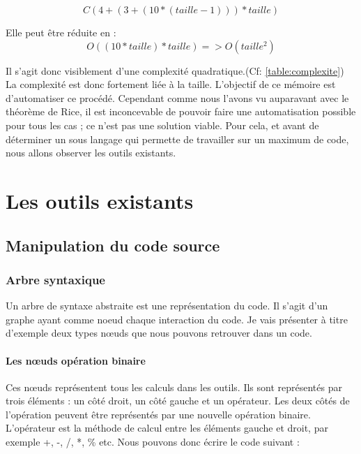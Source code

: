 \documentclass[12pt, twoside, openright]{report}
\begin{document}
\[C(4 + (3 + (10 * (taille - 1))) * taille)\] 

Elle peut être réduite en : \[O((10*taille) * taille) => O(taille^{2})\] 

 Il s'agit donc visiblement d'une complexité quadratique.(Cf: \ref{table:complexite}) La complexité est donc fortement liée à la taille. L'objectif de ce mémoire est d'automatiser ce procédé. Cependant comme nous l'avons vu auparavant avec le théorème de Rice, il est inconcevable de pouvoir faire une automatisation possible pour tous les cas ; ce n'est pas une solution viable. Pour cela, et avant de déterminer un sous langage qui permette de travailler sur un maximum de code, nous allons observer les outils existants. 


\chapter{Les outils existants}


\section{Manipulation du code source}

\subsection{Arbre syntaxique}

Un arbre de syntaxe abstraite est une représentation du code. Il s'agit d'un graphe ayant comme noeud chaque interaction du code. Je vais présenter à titre d'exemple deux types n\oe{}uds que nous pouvons retrouver dans un code.

\subsubsection{Les n\oe{}uds opération binaire}

Ces n\oe{}uds représentent tous les calculs dans les outils. Ils sont représentés par trois éléments : un côté droit, un côté gauche et un opérateur. Les deux côtés de l'opération peuvent être représentés par une nouvelle opération binaire. L'opérateur est la méthode de calcul entre les éléments gauche et droit, par exemple +, -, /, *, \% etc. Nous pouvons donc écrire le code suivant :
\end{document}
